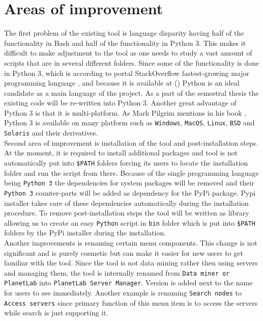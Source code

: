 \section{Areas of improvement}
\label{section:improvement}
The first problem of the existing tool is language disparity having half of the functionality in Bash and half of the functionality in Python 3. This makes it difficult to make adjustment to the tool as one needs to study a vast amount of scripts that are in several different folders. Since some of the functionality is done in Python 3, which is according to portal StackOverflow fastest-growing major programming language \cite{pythonfastestgrowing}, and because it is available at  () Python is an ideal candidate as a main language of the project. As a part of the semestral thesis the existing code will be re-written into Python 3. Another great advantage of Python 3 is that it is multi-platform. As Mark Pilgrim mentions in his book \cite{Pilgrimc2010}, Python 3 is available on many platform such as \texttt{Windows}, \texttt{MacOS}, \texttt{Linux}, \texttt{BSD} and \texttt{Solaris} and their derivatives.\\
Second area of improvement is installation of the tool and post-installation steps. At the moment, it is required to install additional packages and tool is not automatically put into \texttt{\$PATH} folders forcing its users to locate the installation folder and run the script from there. Because of the single programming language being \texttt{Python 3} the dependencies for system packages will be removed and their \texttt{Python 3} counter-parts will be added as dependency for the PyPi package. Pypi installer takes care of these dependencies automatically during the installation procedure. To remove post-installation steps the tool will be written as library allowing us to create an easy \texttt{Python} script in \texttt{bin} folder which is put into \texttt{\$PATH} folders by the PyPi installer during the installation.\\
Another improvements is renaming certain menu components. This change is not significant and is purely cosmetic but can make it easier for new users to get familiar with the tool. Since the tool is not data mining rather then using servers and managing them, the tool is internally renamed from \texttt{Data miner or PlanetLab} into \texttt{PlanetLab Server Manager}. Version is added next to the name for users to see immediately. Another example is renaming \texttt{Search nodes} to \texttt{Access servers} since primary function of this menu item is to access the servers while search is just supporting it.\\
